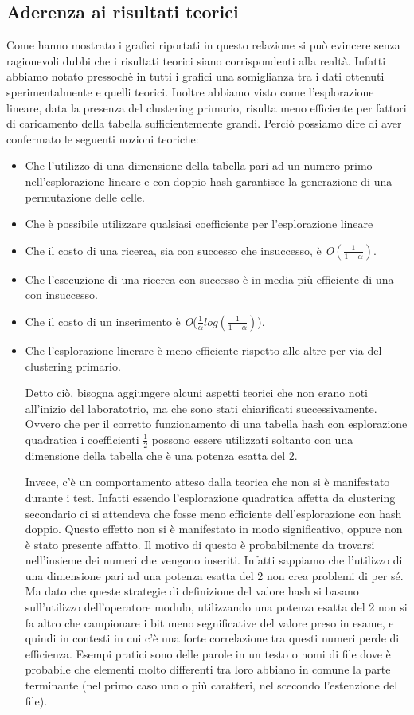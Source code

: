 \documentclass{article}
\newcommand{\bigO}{\emph{O}}
\begin{document}
\subsection{Aderenza ai risultati teorici}
Come hanno mostrato i grafici riportati in questo relazione si può evincere senza ragionevoli dubbi che i risultati teorici siano corrispondenti alla realtà. Infatti abbiamo notato pressochè in tutti i grafici una somiglianza tra i dati ottenuti sperimentalmente e quelli teorici. Inoltre abbiamo visto come l'esplorazione lineare, data la presenza del clustering primario, risulta meno efficiente per fattori di caricamento della tabella sufficientemente grandi. Perciò possiamo dire di aver confermato le seguenti nozioni teoriche:
\begin{itemize}
\item Che l'utilizzo di una dimensione della tabella pari ad un numero primo nell'esplorazione lineare e con doppio hash garantisce la generazione di una permutazione delle celle.
\item Che è possibile utilizzare qualsiasi coefficiente per l'esplorazione lineare
\item Che il costo di una ricerca, sia con successo che insuccesso, è \bigO$(\frac{1}{1 - \alpha})$.
\item Che l'esecuzione di una ricerca con successo è in media più efficiente di una con insuccesso.
\item Che il costo di un inserimento è \bigO($\frac{1}{\alpha}log(\frac{1}{1 - \alpha})$).
\item Che l'esplorazione linerare è meno efficiente rispetto alle altre per via del clustering primario.

Detto ciò, bisogna aggiungere alcuni aspetti teorici che non erano noti all'inizio del laboratotrio, ma che sono stati chiarificati successivamente. Ovvero che per il corretto funzionamento di una tabella hash con esplorazione quadratica i coefficienti $\frac{1}{2}$ possono essere utilizzati soltanto con una dimensione della tabella che è una potenza esatta del 2.

Invece, c'è un comportamento atteso dalla teorica che non si è manifestato durante i test. Infatti essendo l'esplorazione quadratica affetta da clustering secondario ci si attendeva che fosse meno efficiente dell'esplorazione con hash doppio. Questo effetto non si è manifestato in modo significativo, oppure non è stato presente affatto. Il motivo di questo è probabilmente da trovarsi nell'insieme dei numeri che vengono inseriti. Infatti sappiamo che l'utilizzo di una dimensione pari ad una potenza esatta del 2 non crea problemi di per sé. Ma dato che queste strategie di definizione del valore hash si basano sull'utilizzo dell'operatore modulo, utilizzando una potenza esatta del 2 non si fa altro che campionare i bit meno segnificative del valore preso in esame, e quindi in contesti in cui c'è una forte correlazione tra questi numeri perde di efficienza. Esempi pratici sono delle parole in un testo o nomi di file dove è probabile che elementi molto differenti tra loro abbiano in comune la parte terminante (nel primo caso uno o più caratteri, nel scecondo l'estenzione del file). 
\end{itemize}
\end{document}
